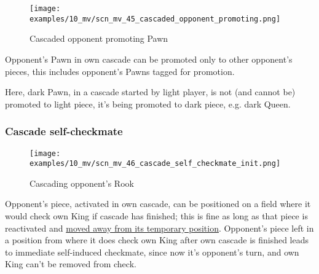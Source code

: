\clearpage %

\vspace*{-2.1\baselineskip}
\noindent
\begin{figure}[h]
\texttt{[image: examples/10\_mv/scn\_mv\_45\_cascaded\_opponent\_promoting.png]}
\caption{Cascaded opponent promoting Pawn}
\label{fig:scn_mv_45_cascaded_opponent_promoting}
\end{figure}

Opponent's Pawn in own cascade can be promoted only to other opponent's pieces,
this includes opponent's Pawns tagged for promotion.

Here, dark Pawn, in a cascade started by light player, is not (and cannot be)
promoted to light piece, it's being promoted to dark piece, e.g. dark Queen.

\clearpage %

\subsubsection*{Cascade self-checkmate}
\label{sec:Miranda's veil/Wave/Cascading opponent/Cascade self-checkmate}

\vspace*{-1.5\baselineskip}
\noindent
\begin{figure}[h]
\texttt{[image: examples/10\_mv/scn\_mv\_46\_cascade\_self\_checkmate\_init.png]}
\vspace*{-1.4\baselineskip}
\caption{Cascading opponent's Rook}
\label{fig:scn_mv_46_cascade_self_checkmate_init}
\end{figure}

\vspace*{-0.4\baselineskip}
Opponent's piece, activated in own cascade, can be positioned on a field where
it would check own King if cascade has finished; this is fine as long as that piece
is reactivated and
\hyperref[fig:scn_mv_41_activated_piece_check_init]{moved away from its temporary position}.
Opponent's piece left in a position from where it does check own King after own cascade
is finished leads to immediate self-induced checkmate, since now it's opponent's turn,
and own King can't be removed from check.

\clearpage %

